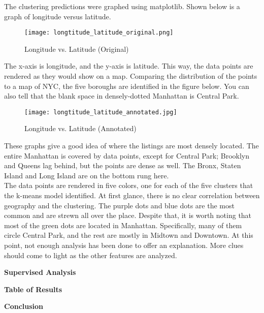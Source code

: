 \documentclass[12pt]{article}
\begin{document}
	The clustering predictions were graphed using matplotlib. Shown below is a graph of longitude versus latitude.\\
	
	\hfill \break
	
	\begin{figure}[H]
		\texttt{[image: longtitude\_latitude\_original.png]}
		\caption{Longitude vs. Latitude (Original)}
	\end{figure}

	The x-axis is longitude, and the y-axis is latitude. This way, the data points are rendered as they would show on a map. Comparing the distribution of the points to a map of NYC, the five boroughs are identified in the figure below. You can also tell that the blank space in densely-dotted Manhattan is Central Park.\\
	
	\begin{figure}[H]
		\texttt{[image: longtitude\_latitude\_annotated.jpg]}
		\caption{Longitude vs. Latitude (Annotated)}
	\end{figure}
	
	These graphs give a good idea of where the listings are most densely located. The entire Manhattan is covered by data points, except for Central Park; Brooklyn and Queens lag behind, but the points are dense as well. The Bronx, Staten Island and Long Island are on the bottom rung	here.\\
	
	The data points are rendered in five colors, one for each of the five clusters that the k-means model identified. At first glance, there is no clear correlation between geography and the clustering. The purple dots and blue dots are the most common and are strewn all over the place. Despite that, it is worth noting that most of the green dots are located in Manhattan. Specifically, many of them circle Central Park, and the rest are mostly in Midtown and Downtown. At this point, not enough analysis has been done to offer an explanation. More clues should come to light as the other features are analyzed.
	
	
	
	\bigskip
	
	\textbf{Supervised Analysis}
	
	\bigskip
	
	\textbf{Table of Results}
	
	\bigskip
	
	\textbf{Conclusion}
\end{document}
